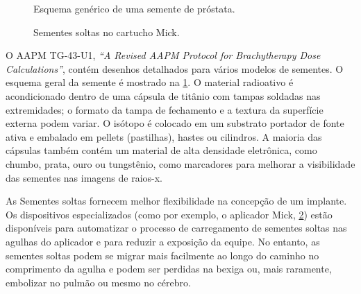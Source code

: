\documentclass[11pt,a4paper]{article}
\newcounter{exemplo}
\begin{document}
	\begin{figure}[h]
		\centering
		\caption{Esquema genérico de uma semente de próstata.}
		\label{fig:esquemaSementeProstata}
	\end{figure}

	\begin{figure}[h]
		\centering
		\caption{Sementes soltas no cartucho Mick.}
		\label{fig:sementesSoltasMick}
	\end{figure}

	O AAPM TG-43-U1, \textit{``A Revised AAPM Protocol for Brachytherapy Dose Calculations''}, contém desenhos detalhados para vários modelos de sementes. O esquema geral da semente é mostrado na \ref{fig:esquemaSementeProstata}. O material radioativo é acondicionado dentro de uma cápsula de titânio com tampas soldadas nas extremidades; o formato da tampa de fechamento e a textura da superfície externa podem variar. O isótopo é colocado em um substrato portador de fonte ativa e embalado em pellets (pastilhas), hastes ou cilindros. A maioria das cápsulas também contém um material de alta densidade eletrônica, como chumbo, prata, ouro ou tungstênio, como marcadores para melhorar a visibilidade das sementes nas imagens de raios-x.

	As Sementes soltas fornecem melhor flexibilidade na concepção de um implante. Os dispositivos especializados (como por exemplo, o aplicador Mick, \ref{fig:sementesSoltasMick}) estão disponíveis para automatizar o processo de carregamento de sementes soltas nas agulhas do aplicador e para reduzir a exposição da equipe. No entanto, as sementes soltas podem se migrar mais facilmente ao longo do caminho no comprimento da agulha e podem ser perdidas na bexiga ou, mais raramente, embolizar no pulmão ou mesmo no cérebro.
\end{document}
